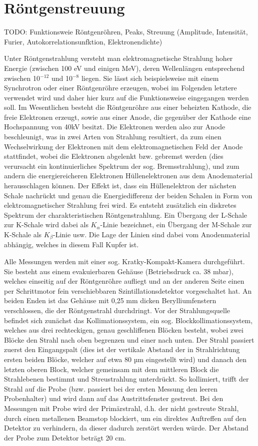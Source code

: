 \documentclass[bigchapter,colorback,accentcolor=tud4b,linedtoc,11pt]{tudreport}
\begin{document}
\section{Röntgenstreuung}
TODO: Funktionsweie Röntgenröhren, Peaks, Streuung (Amplitude, Intensität, Furier, Autokorrelationsunfktion, Elektronendichte)

Unter Röntgenstrahlung versteht man elektromagnetische Strahlung hoher Energie (zwischen 100 eV und einigen MeV), deren Wellenlängen entsprechend zwischen 10$^{-12}$ und 10$^{-8}$ liegen. Sie lässt sich beispielsweise mit einem Synchrotron oder einer Röntgenröhre erzeugen, wobei im Folgenden letztere verwendet wird und daher hier kurz auf die Funktionsweise eingegangen werden soll. Im Wesentlichen besteht die Röntgenröhre aus einer beheizten Kathode, die freie Elektronen erzeugt, sowie aus einer Anode, die gegenüber der Kathode eine Hochspannung von 40kV besitzt. Die Elektronen werden also zur Anode beschleunigt, was in zwei Arten von Strahlung resultiert, da zum einen Wechselwirkung der Elektronen mit dem elektromagnetischen Feld der Anode stattfindet, wobei die Elektronen abgelenkt bzw. gebremst werden (dies verursacht ein kontinuierliches Spektrum der sog. Bremsstrahlung), und zum andern die energiereicheren Elektronen Hüllenelektronen aus dem Anodematerial herausschlagen können. Der Effekt ist, dass ein Hüllenelektron der nächsten Schale nachrückt und genau die Energiedifferenz der beiden Schalen in Form von elektromagnetischer Strahlung frei wird. Es entsteht zusätzlich ein diskretes Spektrum der charakteristischen Röntgenstrahlung. Ein Übergang der L-Schale zur K-Schale wird dabei als $K_{\alpha}$-Linie bezeichnet, ein Übergang der M-Schale zur K-Schale als $K_{\beta}$-Linie usw. Die Lage der Linien sind dabei vom Anodenmaterial abhängig, welches in diesem Fall Kupfer ist. 

Alle Messungen werden mit einer sog. Kratky-Kompakt-Kamera durchgeführt. Sie besteht aus einem evakuierbaren Gehäuse (Betriebsdruck ca. 38 mbar), welches einseitig auf der Röntgenröhre aufliegt und an der anderen Seite einen per Schrittmotor fein verschiebbaren Szintillationsdetektor vorgeschaltet hat. An beiden Enden ist das Gehäuse mit 0,25 mm dicken Berylliumfenstern verschlossen, die der Röntgenstrahl durchdringt. Vor der Strahlungsquelle befindet sich zunächst das Kollimationssystem, ein sog. Blockkollimationssystem, welches aus drei rechteckigen, genau geschliffenen Blöcken besteht, wobei zwei Blöcke den Strahl nach oben begrenzen und einer nach unten. Der Strahl passiert zuerst den Eingangspalt (dies ist der vertikale Abstand der in Strahlrichtung ersten beiden Blöcke, welcher auf etwa 80 µm eingestellt wird) und danach den letzten oberen Block, welcher gemeinsam mit dem mittleren Block die Strahlebenen bestimmt und Streustrahlung unterdrückt. So kollimiert, trifft der Strahl auf die Probe (bzw. passiert bei der ersten Messung den leeren Probenhalter) und wird dann auf das Austrittsfenster gestreut. Bei den Messungen mit Probe wird der Primärstrahl, d.h. der nicht gestreute Strahl, durch einen metallenen Beamstop blockiert, um ein direktes Auftreffen auf den Detektor zu verhindern, da dieser dadurch zerstört werden würde. Der Abstand der Probe zum Detektor beträgt 20 cm.
\end{document}
